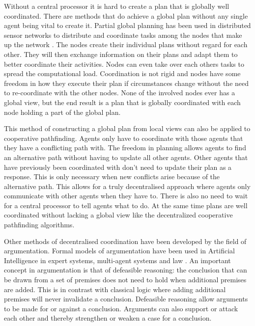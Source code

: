 Without a central processor it is hard to create a plan that is globally well
coordinated. There are methods that do achieve a global plan without any single
agent being vital to create it.
Partial global planning has been used in distributed sensor networks to
distribute and coordinate tasks among the nodes that make up the network
\cite{durfee1991}. The nodes create their individual plans without regard for
each other. They will then exchange information on their plans and adapt them
to better coordinate their activities. Nodes can even take over each others
tasks to spread the computational load. Coordination is not rigid and nodes have
some freedom in how they execute their plan if circumstances change without
the need to re-coordinate with the other nodes. None of the involved nodes ever
has a global view, but the end result is a plan that is globally coordinated
with each node holding a part of the global plan.

This method of constructing a global plan from local views can also be applied
to cooperative pathfinding. Agents only have to coordinate with those agents
that they have a conflicting path with. The freedom in planning allows agents
to find an alternative path without having to update all other agents. Other
agents that have previously been coordinated with don't need to update their
plan as a response. This is only necessary when new conflicts arise because of
the alternative path. This allows for a truly decentralised approach where
agents  only communicate with other agents when they have to. There is also no
need to wait for a central processor to tell agents what to do. At the same
time plans are well coordinated without lacking a global view like the
decentralized cooperative pathfinding algorithms.

Other methods of decentralised coordination have been developed by the field of
argumentation. Formal models of argumentation have been used in Artificial
Intelligence in expert systems, multi-agent systems and law
\cite{vaneemeren2014}. An important concept in argumentation is that of
defeasible reasoning: the conclusion that can be drawn from a set of premises
does not need to hold when additional premises are added. This is in contrast
with classical logic where adding additional premises will never invalidate a
conclusion. Defeasible reasoning allow arguments to be made for or against a
conclusion. Arguments can also support or attack each other and thereby
strengthen or weaken a case for a conclusion.

